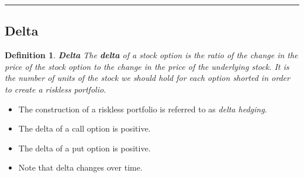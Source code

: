 \documentclass[letterpaper,10pt]{article}
\newtheorem{df}{Definition}[section]
\begin{document}
\bigskip

\hrule

\bigskip

\subsection{Delta}

\begin{df}{\bf Delta}
The {\bf delta} of a stock option is the ratio of the change in the price of the stock option to the change in the price of the underlying stock.  It is the number of units of the stock we should hold for each option shorted in order to create a riskless portfolio.  
\end{df}

\begin{itemize}

\item The construction of a riskless portfolio is referred to as {\em delta hedging}.

\item The delta of a call option is positive.

\item The delta of a put option is positive.

\item Note that delta changes over time.

\end{itemize}

\noindent 





 
\end{document}
